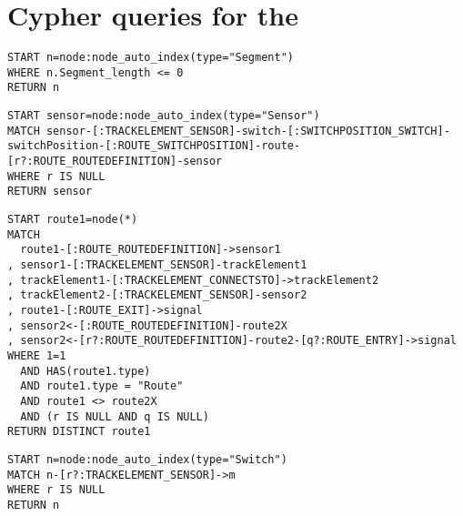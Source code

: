 \chapter{Cypher queries for the \tb}
\label{cypherqueries}


\begin{lstlisting}[caption=Cypher query for the PosLength test case, label=lst:, breaklines=true]
START n=node:node_auto_index(type="Segment")
WHERE n.Segment_length <= 0
RETURN n
\end{lstlisting}

\begin{lstlisting}[caption=Cypher query for the RouteSensor test case, label=lst:, breaklines=true]
START sensor=node:node_auto_index(type="Sensor")
MATCH sensor-[:TRACKELEMENT_SENSOR]-switch-[:SWITCHPOSITION_SWITCH]-switchPosition-[:ROUTE_SWITCHPOSITION]-route-[r?:ROUTE_ROUTEDEFINITION]-sensor
WHERE r IS NULL
RETURN sensor
\end{lstlisting}

\begin{lstlisting}[caption=Cypher query for the SignalNeighbor test case, label=lst:, breaklines=true]
START route1=node(*)
MATCH
  route1-[:ROUTE_ROUTEDEFINITION]->sensor1
, sensor1-[:TRACKELEMENT_SENSOR]-trackElement1
, trackElement1-[:TRACKELEMENT_CONNECTSTO]->trackElement2
, trackElement2-[:TRACKELEMENT_SENSOR]-sensor2
, route1-[:ROUTE_EXIT]->signal
, sensor2<-[:ROUTE_ROUTEDEFINITION]-route2X
, sensor2<-[r?:ROUTE_ROUTEDEFINITION]-route2-[q?:ROUTE_ENTRY]->signal
WHERE 1=1
  AND HAS(route1.type)
  AND route1.type = "Route"
  AND route1 <> route2X
  AND (r IS NULL AND q IS NULL)
RETURN DISTINCT route1
\end{lstlisting}

\begin{lstlisting}[caption=Cypher query for the SwitchSensor test case, label=lst:, breaklines=true]
START n=node:node_auto_index(type="Switch")
MATCH n-[r?:TRACKELEMENT_SENSOR]->m
WHERE r IS NULL
RETURN n
\end{lstlisting}
